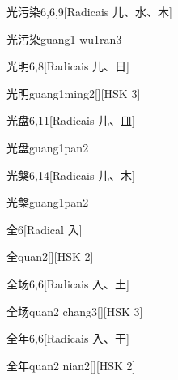 \begin{entry}{光污染}{6,6,9}[Radicais ⼉、⽔、⽊]
  \begin{phonetics}{光污染}{guang1 wu1ran3}
  \end{phonetics}
\end{entry}

\begin{entry}{光明}{6,8}[Radicais ⼉、⽇]
  \begin{phonetics}{光明}{guang1ming2}[][HSK 3]
  \end{phonetics}
\end{entry}

\begin{entry}{光盘}{6,11}[Radicais ⼉、⽫]
  \begin{phonetics}{光盘}{guang1pan2}
  \end{phonetics}
\end{entry}

\begin{entry}{光槃}{6,14}[Radicais ⼉、⽊]
  \begin{phonetics}{光槃}{guang1pan2}
  \end{phonetics}
\end{entry}

\begin{entry}{全}{6}[Radical ⼊]
  \begin{phonetics}{全}{quan2}[][HSK 2]
  \end{phonetics}
\end{entry}

\begin{entry}{全场}{6,6}[Radicais ⼊、⼟]
  \begin{phonetics}{全场}{quan2 chang3}[][HSK 3]
  \end{phonetics}
\end{entry}

\begin{entry}{全年}{6,6}[Radicais ⼊、⼲]
  \begin{phonetics}{全年}{quan2 nian2}[][HSK 2]
  \end{phonetics}
\end{entry}

